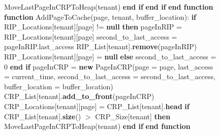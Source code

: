 \begin{figure}[htbp]
\begin{minipage}{\linewidth}
\begin{algorithm}[H]
\begin{algorithmic}
            \STATE \hspace{\algorithmicindent} \hspace{\algorithmicindent} \hspace{\algorithmicindent} MoveLastPageInCRPToHeap(tenant)
            \STATE \hspace{\algorithmicindent} \hspace{\algorithmicindent} \textbf{end if}
            \STATE \hspace{\algorithmicindent} \textbf{end if}
            \STATE \textbf{end function}
            \STATE
            \STATE \textbf{function} AddPageToCache(page, tenant, buffer\_location):
            \STATE \hspace{\algorithmicindent} \textbf{if} RIP\_Locations[tenant][page] != \textbf{null} \textbf{then}
            \STATE \hspace{\algorithmicindent} \hspace{\algorithmicindent} pageInRIP = RIP\_Locations[tenant][page]
            \STATE \hspace{\algorithmicindent} \hspace{\algorithmicindent} second\_to\_last\_access = pageInRIP.last\_access
            \STATE \hspace{\algorithmicindent} \hspace{\algorithmicindent} RIP\_List[tenant].\textbf{remove}(pageInRIP)
            \STATE \hspace{\algorithmicindent} \hspace{\algorithmicindent} RIP\_Locations[tenant][page] = \textbf{null}
            \STATE \hspace{\algorithmicindent} \textbf{else}
            \STATE \hspace{\algorithmicindent} \hspace{\algorithmicindent} second\_to\_last\_access = 0
            \STATE \hspace{\algorithmicindent} \textbf{end if}
            \STATE \hspace{\algorithmicindent} pageInCRP = \textbf{new} PageInCRP(page = page, last\_access = current\_time, second\_to\_last\_access = second\_to\_last\_access, buffer\_location = buffer\_location)
            \STATE \hspace{\algorithmicindent} CRP\_List[tenant].\textbf{add\_to\_front}(pageInCRP)
            \STATE \hspace{\algorithmicindent} CRP\_Locations[tenant][page] = CRP\_List[tenant].\textbf{head}
            \STATE \hspace{\algorithmicindent} \textbf{if} CRP\_List[tenant].\textbf{size}() $>$ CRP\_Size[tenant] \textbf{then}
            \STATE \hspace{\algorithmicindent} \hspace{\algorithmicindent} MoveLastPageInCRPToHeap(tenant)
            \STATE \hspace{\algorithmicindent} \textbf{end if} 
            \STATE \textbf{end function}


\end{algorithmic}
\end{algorithm}
\end{minipage}
\end{figure}
